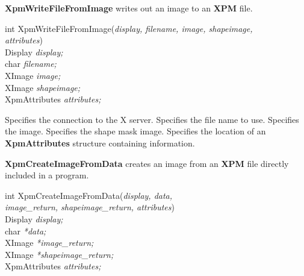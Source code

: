 \vspace{.5cm}
{\bf XpmWriteFileFromImage} writes out an image to an {\bf XPM} file.

\begin{flushleft} 

int XpmWriteFileFromImage({\it display, filename, image, shapeimage,\\
\hspace{3cm}attributes})\\

\hspace{1cm}Display {\it *display;}\\
\hspace{1cm}char {\it *filename;}\\
\hspace{1cm}XImage {\it *image;}\\
\hspace{1cm}XImage {\it *shapeimage;}\\
\hspace{1cm}XpmAttributes {\it *attributes;}

\end{flushleft}

\begin{description}

 Specifies the connection to the X server.
 Specifies the file name to use.
 Specifies the image.
 Specifies the shape mask image.
 Specifies the location of an {\bf XpmAttributes} structure
containing information.

\end{description} 

\vspace{.5cm}
{\bf XpmCreateImageFromData} creates an image from an {\bf XPM} file directly included in a program.

\begin{flushleft} 

int XpmCreateImageFromData({\it display, data, \\
\hspace{3cm}image\_return, shapeimage\_return, attributes})\\

\hspace{1cm}Display {\it *display;}\\
\hspace{1cm}char {\it **data;}\\
\hspace{1cm}XImage {\it **image\_return;}\\
\hspace{1cm}XImage {\it **shapeimage\_return;}\\
\hspace{1cm}XpmAttributes {\it *attributes;}

\end{flushleft}

